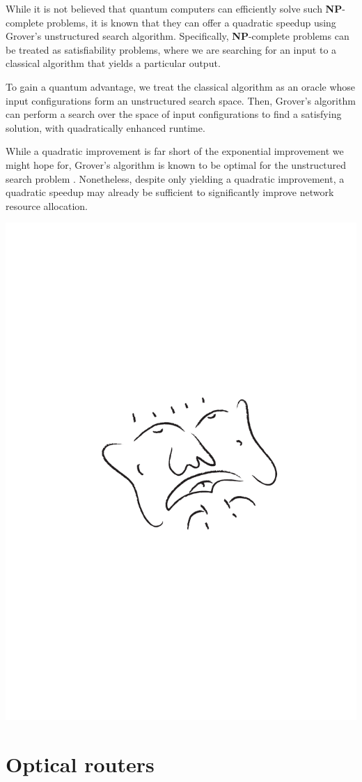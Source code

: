 \documentclass[aps, rmp, twocolumn, amsmath, amssymb, nofootinbib, superscriptaddress, longbibliography, floatfix, table-of-contents, eqsecnum]{revtex4-1}
\begin{document}
While it is not believed that quantum computers can efficiently solve such \textbf{NP}-complete problems, it is known that they can offer a quadratic speedup using Grover's unstructured search algorithm. Specifically, \textbf{NP}-complete problems can be treated as satisfiability problems, where we are searching for an input to a classical algorithm that yields a particular output.

To gain a quantum advantage, we treat the classical algorithm as an oracle whose input configurations form an unstructured search space. Then, Grover's algorithm can perform a search over the space of input configurations to find a satisfying solution, with quadratically enhanced runtime.

While a quadratic improvement is far short of the exponential improvement we might hope for, Grover's algorithm is known to be optimal for the unstructured search problem \cite{?}. Nonetheless, despite only yielding a quadratic improvement, a quadratic speedup may already be sufficient to significantly improve network resource allocation.

\begin{center}
	\includegraphics[width=0.6\columnwidth]{sketch_21}
\end{center}

%
%

\section{Optical routers} 
\end{document}
